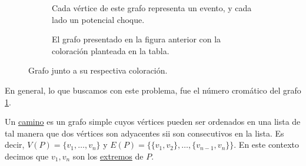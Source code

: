 \begin{prob}
    \begin{figure}
        \centering
        \begin{subfigure}[b]{0.4\textwidth}
            \caption{Cada vértice de este grafo representa un evento, y cada lado un potencial choque.}
        \end{subfigure}
        \hfill
        \begin{subfigure}[b]{0.4\textwidth}
            \caption{El grafo presentado en la figura anterior con la coloración planteada en la tabla.}
        \end{subfigure}
        \caption{Grafo junto a su respectiva coloración.}
        \label{fig:eventos-convencion}
    \end{figure}
    
    En general, lo que buscamos con este problema, fue el número cromático del grafo \ref{fig:eventos-convencion}.
\end{prob}

\begin{defn}
    Un \ul{camino} es un grafo simple cuyos vértices pueden ser ordenados en una lista de tal manera que dos vértices son adyacentes sii son consecutivos en la lista. Es decir, $V(P) = \{v_1, \dots, v_n\}$ y $E(P) = \{ \{v_1,v_2\}, \dots, \{v_{n-1},v_n\} \}$. En este contexto decimos que $v_1, v_n$ son los \ul{extremos} de $P$.
\end{defn}

\begin{marginfigure}
    \centering
    \caption{}
    \label{fig:camino-ejemplo}
\end{marginfigure}

